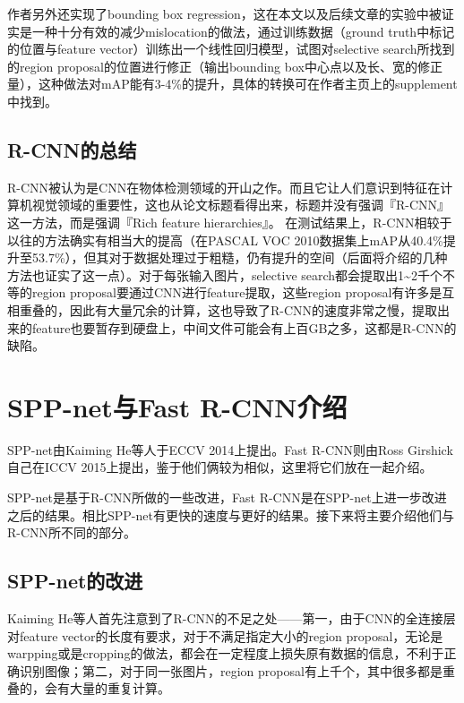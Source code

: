 \documentclass[10pt,twocolumn,letterpaper]{article}
\begin{document}
作者另外还实现了bounding box regression，这在本文以及后续文章的实验中被证实是一种十分有效的减少mislocation的做法，通过训练数据（ground truth中标记的位置与feature vector）训练出一个线性回归模型，试图对selective search所找到的region proposal的位置进行修正（输出bounding box中心点以及长、宽的修正量），这种做法对mAP能有3-4\%的提升，具体的转换可在作者主页上的supplement中找到。
\subsection{R-CNN的总结}
R-CNN被认为是CNN在物体检测领域的开山之作。而且它让人们意识到特征在计算机视觉领域的重要性，这也从论文标题看得出来，标题并没有强调『R-CNN』这一方法，而是强调『Rich feature hierarchies』。
在测试结果上，R-CNN相较于以往的方法确实有相当大的提高（在PASCAL VOC 2010数据集上mAP从40.4\%提升至53.7\%），但其对于数据处理过于粗糙，仍有提升的空间（后面将介绍的几种方法也证实了这一点）。对于每张输入图片，selective search都会提取出1\~{}2千个不等的region proposal要通过CNN进行feature提取，这些region proposal有许多是互相重叠的，因此有大量冗余的计算，这也导致了R-CNN的速度非常之慢，提取出来的feature也要暂存到硬盘上，中间文件可能会有上百GB之多，这都是R-CNN的缺陷。

\section{SPP-net与Fast R-CNN介绍}
SPP-net由Kaiming He等人于ECCV 2014上提出。Fast R-CNN则由Ross Girshick自己在ICCV 2015上提出，鉴于他们俩较为相似，这里将它们放在一起介绍。

SPP-net是基于R-CNN所做的一些改进，Fast R-CNN是在SPP-net上进一步改进之后的结果。相比SPP-net有更快的速度与更好的结果。接下来将主要介绍他们与R-CNN所不同的部分。

\subsection{SPP-net的改进}
Kaiming He等人首先注意到了R-CNN的不足之处——第一，由于CNN的全连接层对feature vector的长度有要求，对于不满足指定大小的region proposal，无论是warpping或是cropping的做法，都会在一定程度上损失原有数据的信息，不利于正确识别图像；第二，对于同一张图片，region proposal有上千个，其中很多都是重叠的，会有大量的重复计算。
\end{document}
